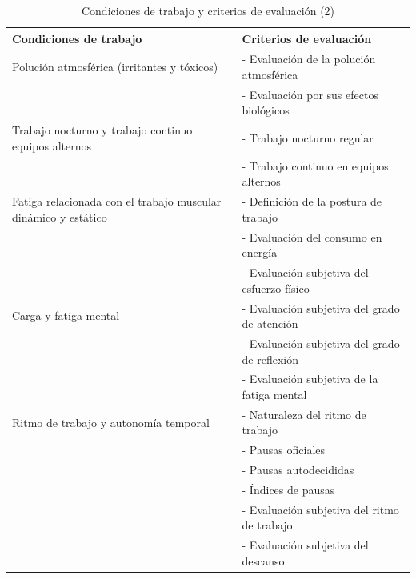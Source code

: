\documentclass{article} %
\begin{document}
    \begin{table}[h!]
    \centering
    \begin{tabular}{|l|l|}
    \hline
    \textbf{Condiciones de trabajo}          & \textbf{Criterios de evaluación}                                  \\ \hline
    Polución atmosférica (irritantes y tóxicos) & - Evaluación de la polución atmosférica                           \\
                                             & - Evaluación por sus efectos biológicos                           \\ \hline
    Trabajo nocturno y trabajo continuo equipos alternos & - Trabajo nocturno regular                             \\
                                             & - Trabajo continuo en equipos alternos                           \\ \hline
    Fatiga relacionada con el trabajo muscular dinámico y estático & - Definición de la postura de trabajo      \\
                                             & - Evaluación del consumo en energía                               \\
                                             & - Evaluación subjetiva del esfuerzo físico                        \\ \hline
    Carga y fatiga mental                    & - Evaluación subjetiva del grado de atención                      \\
                                             & - Evaluación subjetiva del grado de reflexión                     \\
                                             & - Evaluación subjetiva de la fatiga mental                        \\ \hline
    Ritmo de trabajo y autonomía temporal    & - Naturaleza del ritmo de trabajo                                 \\
                                             & - Pausas oficiales                                                \\
                                             & - Pausas autodecididas                                            \\
                                             & - Índices de pausas                                               \\
                                             & - Evaluación subjetiva del ritmo de trabajo                       \\
                                             & - Evaluación subjetiva del descanso                               \\ \hline
    \end{tabular}
    \caption{Condiciones de trabajo y criterios de evaluación (2)}
    \end{table}
    
\end{document}
